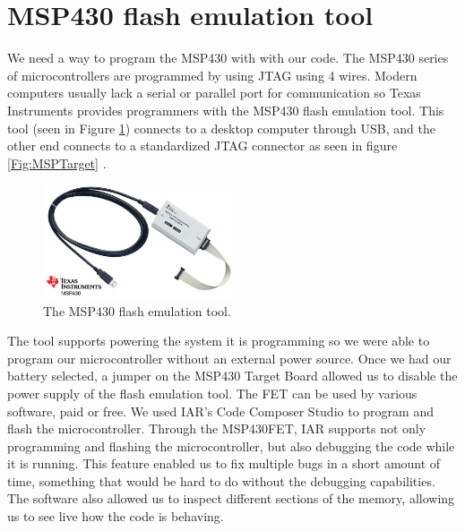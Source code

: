 \section{MSP430 flash emulation tool}
\label{Sec:MSP430FET}
We need a way to program the MSP430 with with our code. The MSP430 series of microcontrollers are programmed by using JTAG using 4 wires. Modern computers usually lack a serial or parallel port for communication so Texas Instruments provides programmers with the MSP430 flash emulation tool. This tool (seen in Figure \ref{Fig:MSP430FET}) connects to a desktop computer through USB, and the other end connects to a standardized JTAG connector as seen in figure \ref{Fig:MSPTarget} \cite{Web:MSPFETPAGE}. 
\begin{figure}
\begin{center}
\includegraphics[width=0.5\textwidth]{images/MSP430FETUIF.jpg}
\caption{The MSP430 flash emulation tool.}
\label{Fig:MSP430FET}
\end{center}
\end{figure}

The tool supports powering the system it is programming so we were able to program our microcontroller without an external power source. Once we had our battery selected, a jumper on the MSP430 Target Board allowed us to disable the power supply of the flash emulation tool. The FET can be used by various software, paid or free. We used IAR's Code Composer Studio to program and flash the microcontroller. Through the MSP430FET, IAR supports not only programming and flashing the microcontroller, but also debugging the code while it is running. This feature enabled us to fix multiple bugs in a short amount of time, something that would be hard to do without the debugging capabilities. The software also allowed us to inspect different sections of the memory, allowing us to see live how the code is behaving.

